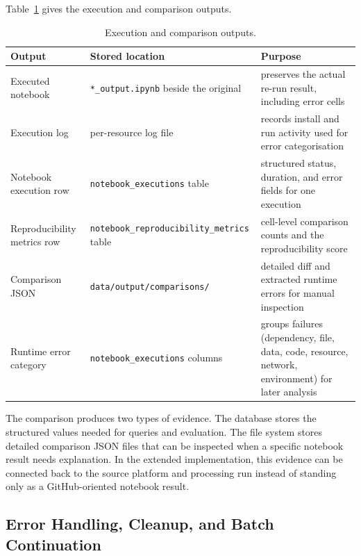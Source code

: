 Table~\ref{tab:execution-comparison-outputs} gives the execution and comparison outputs.

\begin{table}[ht]
\centering
\caption{Execution and comparison outputs.}
\label{tab:execution-comparison-outputs}
\small
\begin{tabularx}{\textwidth}{@{}>{\raggedright\arraybackslash}p{3.3cm}>{\raggedright\arraybackslash}p{4.3cm}>{\raggedright\arraybackslash}X@{}}
\toprule
Output & Stored location & Purpose\tabularnewline
\midrule
Executed notebook & \texttt{*\_output.ipynb} beside the original & preserves the actual re-run result, including error cells\tabularnewline
Execution log & per-resource log file & records install and run activity used for error categorisation\tabularnewline
Notebook execution row & \texttt{notebook\_}\linebreak\texttt{executions} table & structured status, duration, and error fields for one execution\tabularnewline
Reproducibility metrics row & \texttt{notebook\_}\linebreak\texttt{reproducibility\_}\linebreak\texttt{metrics} table & cell-level comparison counts and the reproducibility score\tabularnewline
Comparison JSON & \texttt{data/output/}\linebreak\texttt{comparisons/} & detailed diff and extracted runtime errors for manual inspection\tabularnewline
Runtime error category & \texttt{notebook\_}\linebreak\texttt{executions} columns & groups failures (dependency, file, data, code, resource, network, environment) for later analysis\tabularnewline
\bottomrule
\end{tabularx}
\end{table}

The comparison produces two types of evidence. The database stores the structured values needed for queries and evaluation. The file system stores detailed comparison JSON files that can be inspected when a specific notebook result needs explanation. In the extended implementation, this evidence can be connected back to the source platform and processing run instead of standing only as a GitHub-oriented notebook result.

\FloatBarrier
\subsection{Error Handling, Cleanup, and Batch Continuation}

